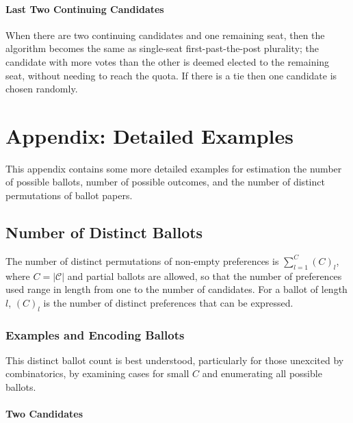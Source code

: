 \documentclass[runningheads,a4paper]{llncs}
\newcommand{\candidates}{\ensuremath{\mathcal{C}}\xspace}
\begin{document}
\paragraph{Last Two Continuing Candidates}

When there are two continuing candidates and one remaining seat, then
the algorithm becomes the same as single-seat first-past-the-post
plurality; the candidate with more votes than the other is deemed
elected to the remaining seat, without needing to reach the quota.  If
there is a tie then one candidate is chosen randomly.

\section{Appendix: Detailed Examples}

This appendix contains some more detailed examples for estimation the
number of possible ballots, number of possible outcomes, and the
number of distinct permutations of ballot papers.

\subsection{Number of Distinct Ballots}

The number of distinct permutations of non-empty preferences is
$\displaystyle\sum_{l=1}^{C}{{(C)}_{l}}$, where $C=|\candidates|$ and
partial ballots are allowed, so that the number of preferences used
range in length from one to the number of candidates.  For a ballot of
length $l$, ${(C)}_{l}$ is the number of distinct preferences that can
be expressed.

\subsubsection{Examples and Encoding Ballots}

This distinct ballot count is best understood, particularly for those
unexcited by combinatorics, by examining cases for small $C$ and
enumerating all possible ballots.

\paragraph*{Two Candidates}
\end{document}
